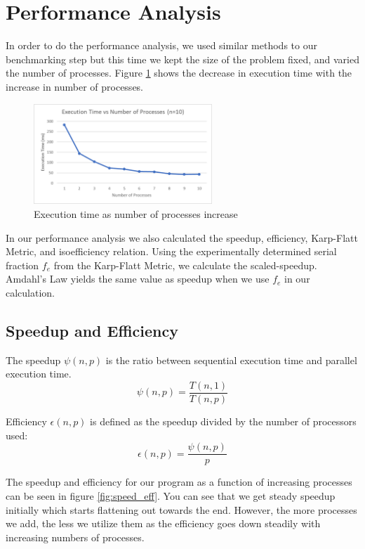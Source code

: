 \documentclass{article}
\begin{document}
\section{Performance Analysis}
In order to do the performance analysis, we used similar methods to our 
benchmarking step but this time we kept the size of the problem fixed, and 
varied the number of processes. Figure \ref{fig:benchmark_p} shows the decrease 
in execution time with the increase in number of processes. 

\begin{figure}[ht]
	\centering
    \includegraphics[width=0.6\textwidth]{benchmark_p.png} 
    \caption{Execution time as number of processes increase}
    \label{fig:benchmark_p}
\end{figure}

\medskip
\noindent
In our performance analysis we also calculated the speedup, efficiency, 
Karp-Flatt Metric, and isoefficiency relation. Using the experimentally 
determined serial fraction $f_e$ from the Karp-Flatt Metric, we calculate the 
scaled-speedup. Amdahl's Law yields the same value as speedup when we use $f_e$ 
in our calculation.

\subsection{Speedup and Efficiency}

The speedup $\psi(n, p)$ is the ratio between sequential execution time and 
parallel execution time.
\[\psi(n, p) = \frac{T(n, 1)}{T(n, p)}\]

\medskip
\noindent
Efficiency $\epsilon(n,p)$ is defined as the speedup divided by the number of 
processors used:
\[\epsilon(n, p) = \frac{\psi(n,p)}{p}\]

\medskip
\noindent
The speedup and efficiency for our program as a function of increasing processes
can be seen in figure \ref{fig:speed_eff}. You can see that we get steady 
speedup initially which starts flattening out towards the end. However, the more
processes we add, the less we utilize them as the efficiency goes down steadily 
with increasing numbers of processes.
\end{document}
